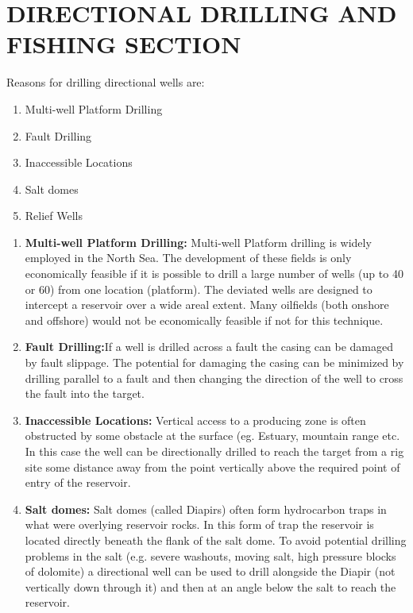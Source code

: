 \chapter{DIRECTIONAL DRILLING AND FISHING SECTION}

Reasons for drilling directional wells are:

\begin{enumerate}
\item Multi-well Platform Drilling
\item Fault Drilling
\item Inaccessible Locations
\item Salt domes
\item Relief Wells
\end{enumerate}

\begin{enumerate}

\item \textbf{Multi-well Platform Drilling:} Multi-well Platform drilling is
widely employed in the North Sea. The development of these
fields is only economically feasible if it is possible to drill a
large number of wells (up to 40 or 60) from one location
(platform). The deviated wells are designed to intercept a
reservoir over a wide areal extent. Many oilfields (both onshore
and offshore) would not be economically feasible if not for this
technique.

\item \textbf{Fault Drilling:}If a well is drilled across a fault the casing can
be damaged by fault slippage. The potential for damaging the
casing can be minimized by drilling parallel to a fault and then
changing the direction of the well to cross the fault into the
target.



\item \textbf{Inaccessible Locations:} Vertical access to a producing zone is
often obstructed by some obstacle at the surface (eg. Estuary,
mountain range etc. In this case the well can be directionally
drilled to reach the target from a rig site some distance away
from the point vertically above the required point of entry of the
reservoir.



\item \textbf{Salt domes:} Salt domes (called Diapirs) often
form hydrocarbon traps in what were overlying
reservoir rocks. In this form of trap the reservoir
is located directly beneath the flank of the salt
dome. To avoid potential drilling problems in
the salt (e.g. severe washouts, moving salt, high
pressure blocks of dolomite) a directional well
can be used to drill alongside the Diapir (not
vertically down through it) and then at an angle
below the salt to reach the reservoir.





\end{enumerate}
